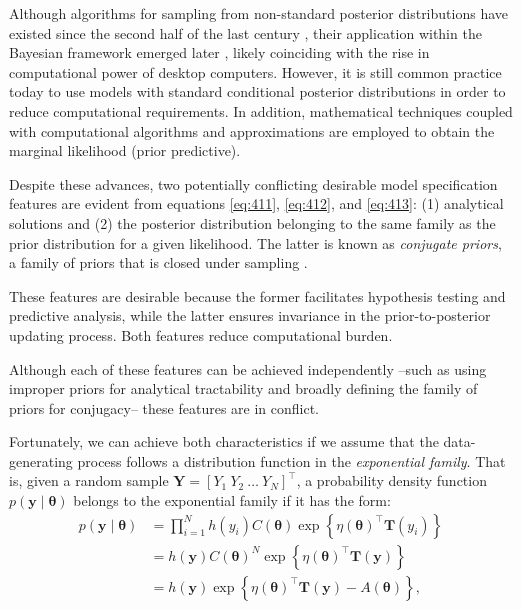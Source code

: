 Although algorithms for sampling from non-standard posterior distributions have existed since the second half of the last century \cite{metropolis53,hastings70,Geman1984}, their application within the Bayesian framework emerged later \cite{Gelfand1990,tierney1994markov}, likely coinciding with the rise in computational power of desktop computers. However, it is still common practice today to use models with standard conditional posterior distributions in order to reduce computational requirements. In addition, mathematical techniques coupled with computational algorithms \cite{gelfand1994bayesian, chib1995marginal, chib2001marginal} and approximations \cite{Tierney1986,Jordan1999} are employed to obtain the marginal likelihood (prior predictive).

Despite these advances, two potentially conflicting desirable model specification features are evident from equations \ref{eq:411}, \ref{eq:412}, and \ref{eq:413}: (1) analytical solutions and (2) the posterior distribution belonging to the same family as the prior distribution for a given likelihood. The latter is known as \textit{conjugate priors}, a family of priors that is closed under sampling \cite{schlaifer1961applied}.

These features are desirable because the former facilitates hypothesis testing and predictive analysis, while the latter ensures invariance in the prior-to-posterior updating process. Both features reduce computational burden.

Although each of these features can be achieved independently --such as using improper priors for analytical tractability and broadly defining the family of priors for conjugacy-- these features are in conflict.

Fortunately, we can achieve both characteristics if we assume that the data-generating process follows a distribution function in the \textit{exponential family}. That is, given a random sample $\bm{Y}=[Y_1 \ Y_2 \ \dots \ Y_N]^{\top}$, a probability density function $p(\bm{y}\mid \bm{\theta})$ belongs to the exponential family if it has the form:
\begin{align}
	p(\bm{y}\mid \bm{\theta})&=\prod_{i=1}^N h(y_i) C(\bm{\theta}) \exp\left\{\eta(\bm{\theta})^{\top}\bm{T}(y_i)\right\}\label{eq:414}\\ 
	&=h(\bm{y}) C(\bm{\theta})^N\exp\left\{\eta(\bm{\theta})^{\top}\bm{T}(\bm{y})\right\}\nonumber \\
	&=h(\bm{y})\exp\left\{\eta(\bm{\theta})^{\top}\bm{T}(\bm{y})-A(\bm{\theta})\right\}\nonumber,
\end{align}


